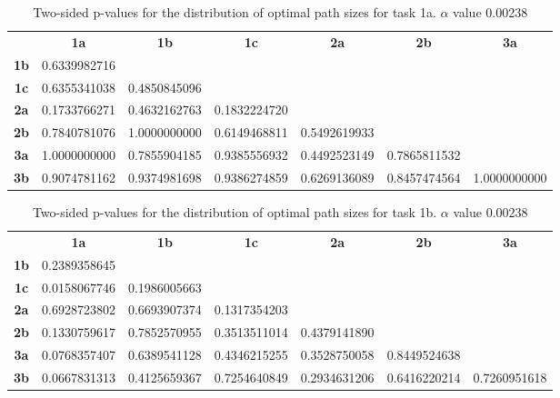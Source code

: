\begin{table}[h!]
    \centering
    \begin{tabular}{ccccccc}
                & \textbf{1a}  & \textbf{1b}  & \textbf{1c}  & \textbf{2a}  & \textbf{2b}  & \textbf{3a}  \\
    \textbf{1b} & 0.6339982716 &              &              &              &              &              \\
    \textbf{1c} & 0.6355341038 & 0.4850845096 &              &              &              &              \\
    \textbf{2a} & 0.1733766271 & 0.4632162763 & 0.1832224720 &              &              &              \\
    \textbf{2b} & 0.7840781076 & 1.0000000000 & 0.6149468811 & 0.5492619933 &              &              \\
    \textbf{3a} & 1.0000000000 & 0.7855904185 & 0.9385556932 & 0.4492523149 & 0.7865811532 &              \\
    \textbf{3b} & 0.9074781162 & 0.9374981698 & 0.9386274859 & 0.6269136089 & 0.8457474564 & 1.0000000000
    \end{tabular}
    \caption[p-table for path sizes (task 1a)]{Two-sided p-values for the distribution of optimal path sizes for task 1a. \(\alpha\) value 0.00238}
    \label{tab:exp2.pathsize1a}
\end{table}

\begin{table}[h!]
    \centering
    \begin{tabular}{ccccccc}
                & \textbf{1a}  & \textbf{1b}  & \textbf{1c}  & \textbf{2a}  & \textbf{2b}  & \textbf{3a}  \\
    \textbf{1b} & 0.2389358645 &              &              &              &              &              \\
    \textbf{1c} & 0.0158067746 & 0.1986005663 &              &              &              &              \\
    \textbf{2a} & 0.6928723802 & 0.6693907374 & 0.1317354203 &              &              &              \\
    \textbf{2b} & 0.1330759617 & 0.7852570955 & 0.3513511014 & 0.4379141890 &              &              \\
    \textbf{3a} & 0.0768357407 & 0.6389541128 & 0.4346215255 & 0.3528750058 & 0.8449524638 &              \\
    \textbf{3b} & 0.0667831313 & 0.4125659367 & 0.7254640849 & 0.2934631206 & 0.6416220214 & 0.7260951618
    \end{tabular}
    \caption[p-table for path sizes (task 1b)]{Two-sided p-values for the distribution of optimal path sizes for task 1b. \(\alpha\) value 0.00238}
    \label{tab:exp2.pathsize1b}
\end{table}

